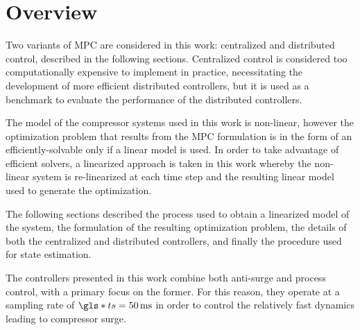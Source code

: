 \section{Overview}

Two variants of MPC are considered in this work: centralized and distributed control, described in the following sections.
Centralized control is considered too computationally expensive to implement in practice, necessitating the development of more efficient distributed controllers, but it is used as a benchmark to evaluate the performance of the distributed controllers.

The model of the compressor systems used in this work is non-linear, however the optimization problem that results from the MPC formulation is in the form of an efficiently-solvable  only if a linear model is used.
In order to take advantage of efficient  solvers, a linearized approach is taken in this work whereby the non-linear system is re-linearized at each time step and the resulting linear model used to generate the optimization. 

The following sections described the process used to obtain a linearized model of the system, the formulation of the resulting optimization problem, the details of both the centralized and distributed controllers, and finally the procedure used for state estimation.

The controllers presented in this work combine both anti-surge and process control, with a primary focus on the former. 
For this reason, they operate at a sampling rate of $\g{ts} = \u{50}{ms}$ in order to control the relatively fast dynamics leading to compressor surge.

